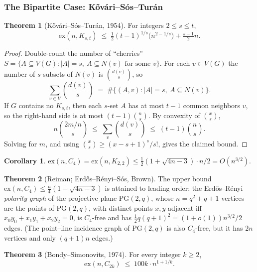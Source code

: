 \documentclass{article}
\theoremstyle{definition}
\newtheorem{theorem}{Theorem}
\newtheorem{corollary}{Corollary}
\begin{document}
\subsubsection{The Bipartite Case: K\H{o}v\'ari--S\'os--Tur\'an}

\begin{theorem}[K\H{o}v\'ari--S\'os--Tur\'an, 1954]\label{thm:kst}
For integers $2 \le s \le t$,
\[
  \mathrm{ex}(n, K_{s, t}) \;\le\; \tfrac{1}{2}(t - 1)^{1/s}\big(n^{2 - 1/s}\big) + \tfrac{s - 1}{2} n.
\]
\end{theorem}

\begin{proof}
Double-count the number of ``cherries'' $S = \{A \subseteq V(G) : |A| = s,\ A \subseteq N(v) \text{ for some } v\}$.
For each $v \in V(G)$ the number of $s$-subsets of $N(v)$ is
$\binom{d(v)}{s}$, so
\[
  \sum_{v \in V} \binom{d(v)}{s} \;=\; \#\{(A, v) : |A| = s,\ A \subseteq N(v)\}.
\]
If $G$ contains no $K_{s, t}$, then each $s$-set $A$ has at most
$t - 1$ common neighbors $v$, so the right-hand side is at most
$(t - 1)\binom{n}{s}$. By convexity of $\binom{x}{s}$,
\[
  n \binom{2m/n}{s} \;\le\; \sum_v \binom{d(v)}{s} \;\le\; (t - 1)\binom{n}{s}.
\]
Solving for $m$, and using $\binom{x}{s} \ge (x - s + 1)^s / s!$,
gives the claimed bound.
\end{proof}

\begin{corollary}
$\mathrm{ex}(n, C_4) = \mathrm{ex}(n, K_{2, 2}) \le \tfrac{1}{2}(1 + \sqrt{4n - 3}) \cdot n / 2 = O(n^{3/2})$.
\end{corollary}

\begin{theorem}[Reiman; Erd\H{o}s--R\'enyi--S\'os, Brown]
The upper bound $\mathrm{ex}(n, C_4) \le \tfrac{n}{4}(1 + \sqrt{4n - 3})$
is attained to leading order: the Erd\H{o}s--R\'enyi \emph{polarity graph}
of the projective plane $\mathrm{PG}(2, q)$, whose $n = q^2 + q + 1$
vertices are the points of $\mathrm{PG}(2, q)$, with distinct points
$x, y$ adjacent iff $x_0 y_0 + x_1 y_1 + x_2 y_2 = 0$, is $C_4$-free and has
$\tfrac12 q(q+1)^2 = (1 + o(1)) n^{3/2}/2$ edges. (The point--line
incidence graph of $\mathrm{PG}(2, q)$ is also $C_4$-free, but it has
$2n$ vertices and only $(q+1)n$ edges.)
\end{theorem}

\begin{theorem}[Bondy--Simonovits, 1974]
For every integer $k \ge 2$,
\[
  \mathrm{ex}(n, C_{2k}) \;\le\; 100 k \cdot n^{1 + 1/k}.
\]
\end{theorem}
\end{document}
